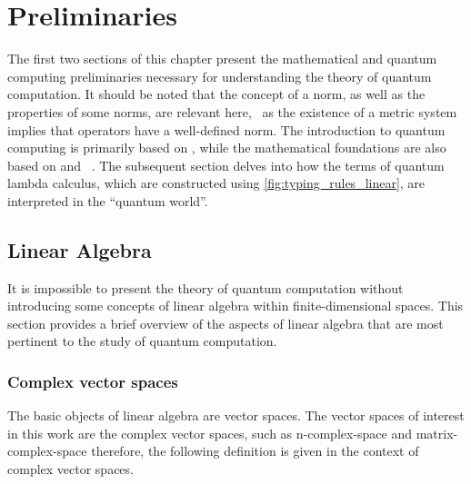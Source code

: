 \chapter{Preliminaries} \label{sec:Preliminaries}






The first two sections of this chapter present the mathematical and quantum computing preliminaries necessary for understanding the theory of quantum computation. It should be noted that the concept of a norm, as well as the properties of some norms, are relevant here,  as the existence of a metric system implies that operators have a well-defined norm. The introduction to quantum computing is primarily based on \cite{nielsen2010quantum,watrous2018theory}, while the mathematical foundations are also based on \cite{rudin91functional} and  \cite{guide2006infinite}. The subsequent section delves into how the terms of quantum lambda calculus, which are constructed using \autoref{fig:typing_rules_linear}, are interpreted in the ``quantum world''. 

\section{Linear Algebra} \label{sec:linalg}





It is impossible to present the theory of quantum computation without introducing some concepts of linear algebra within finite-dimensional spaces. This section provides a brief overview of the aspects of linear algebra that are most pertinent to the study of quantum computation. 

\subsection{Complex vector spaces}

The basic objects of linear algebra are vector spaces. The vector spaces of interest in this work are the complex vector spaces, such as \gls{n-complex-space} and \gls{matrix-complex-space} therefore, the following definition is given in the context of complex vector spaces. 

